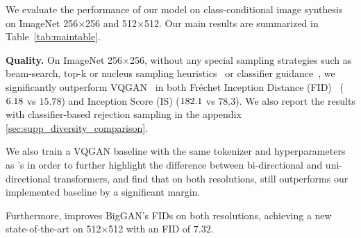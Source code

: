 We evaluate the performance of our model on class-conditional image synthesis on ImageNet 256$\times$256 and 512$\times$512. Our main results are summarized in Table~\ref{tab:maintable}.

\noindent\textbf{Quality.}
On ImageNet 256$\times$256, without any special sampling strategies such as beam-search, top-k or nucleus sampling heuristics~\cite{holtzman2019nucleus} or classifier guidance~\cite{Razavi19vqvae2}, we significantly outperform VQGAN~\cite{Esser21vqgan} in both Fr\'{e}chet Inception Distance (FID)~\cite{FID} ($6.18$ vs $15.78$) and Inception Score (IS) ($182.1$ vs $78.3$). We also report the results with classifier-based rejection sampling in the appendix \ref{sec:supp_diversity_comparison}. 

We also train a VQGAN baseline with the same tokenizer and hyperparameters as \model's in order to further highlight the difference between bi-directional and uni-directional transformers, and find that on both resolutions, \model still outperforms our implemented baseline by a significant margin. 

Furthermore, \model improves BigGAN's FIDs on both resolutions, achieving a new state-of-the-art on 512$\times$512 with an FID of $7.32$.

